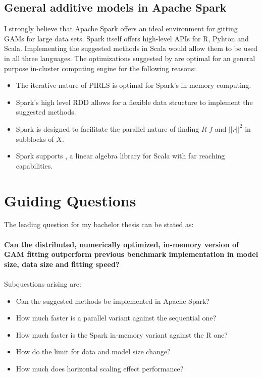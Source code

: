 \documentclass{article}
\begin{document}
    \subsection{General additive models in Apache Spark}
    I strongly believe that Apache Spark offers an ideal environment for gitting GAMs for large data sets. Spark itself offers high-level APIs for R, Pyhton and Scala. Implementing the suggested methods in Scala would allow them to be used in all three languages. The optimizations suggested by \cite{bigdataGAM} are optimal for an general purpose in-cluster computing engine for the following reasons:
    \begin{itemize}
        \item The iterative nature of PIRLS is optimal for Spark's in memory computing.
        \item Spark's high level RDD allows for a flexible data structure to implement the suggested methods.
        \item Spark is designed to facilitate the parallel nature of finding $R$ $f$ and $||r||^2$ in subblocks of $X$.
        \item Spark supports \cite{Breeze}, a linear algebra library for Scala with far reaching capabilities.
    \end{itemize}

    \section{Guiding Questions}

    The leading question for my bachelor thesis can be stated as:
    \paragraph{Can the distributed, numerically optimized, in-memory version of GAM fitting outperform previous benchmark implementation in model size, data size and fitting speed?}

    \paragraph{}
    Subquestions arising are:
        \begin{itemize}
        \item Can the suggested methods be implemented in Apache Spark?
        \item How much faster is a parallel variant against the sequential one?
        \item How much faster is the Spark in-memory variant against the R one?
        \item How do the limit for data and model size change?
        \item How much does horizontal scaling effect performance?
        \end{itemize}
\end{document}
